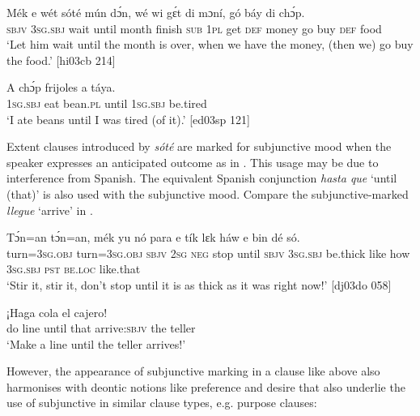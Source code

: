 \ea%
    \label{ex:key:1510}
    \gll Mék    e    wét    sóté    mún    dɔ́n,    wé  wi  gɛ́t  di  mɔní,
gó  báy  di  chɔ́p.\\
\textsc{sbjv}    \textsc{3sg.sbj}  wait    until  month  finish  \textsc{sub}  \textsc{1pl}  get  \textsc{def}  money
go  buy  \textsc{def}  food\\

\glt ‘Let him wait until the month is over, when we have the money, (then we) 
go buy the food.’ [hi03cb 214]
\z


\ea%
    \label{ex:key:1511}
    \gll A    chɔ́p  frijoles      a    táya.\\
\textsc{1sg.sbj}  eat    bean.\textsc{pl}  until  \textsc{1sg.sbj}  be.tired\\

\glt ‘I ate beans until I was tired (of it).’ [ed03sp 121]
\z

Extent clauses introduced by \textit{sóté} are marked for subjunctive mood when the speaker expresses an anticipated outcome as in . This usage may be due to interference from Spanish. The equivalent Spanish conjunction \textit{hasta que} ‘until (that)’ is also used with the subjunctive mood. Compare the subjunctive-marked \textit{llegue} ‘arrive’ in .


\ea%
    \label{ex:key:1512}
    \gll Tɔ́n=an    tɔ́n=an,    mék  yu  nó  para           e    tík
lɛk  háw    e    bin  dé    só.\\
turn=\textsc{3sg.obj}  turn=\textsc{3sg.obj}  \textsc{sbjv}  \textsc{2sg}  \textsc{neg}  stop    until  \textsc{sbjv}    \textsc{3sg.sbj}  be.thick
like  how    \textsc{3sg.sbj}  \textsc{pst}  \textsc{be.loc}  like.that\\

\glt ‘Stir it, stir it, don’t stop until it is as thick as it was right now!’ [dj03do 058]
\z


\ea%
    \label{ex:key:1513}
    \gll ¡Haga  cola           el  cajero!\\
do    line    until that  arrive:\textsc{sbjv}  the  teller\\

\glt ‘Make a line until the teller arrives!’
\z

However, the appearance of subjunctive marking in a clause like  above also harmonises with deontic notions like preference and desire that also underlie the use of subjunctive in similar clause types, e.g. purpose clauses:

